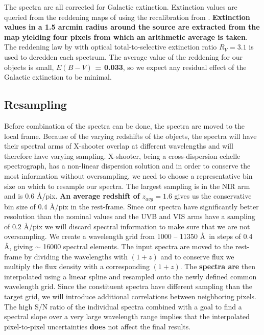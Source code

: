 \documentclass{aa}    %
\newcommand{\sectlabel}[1]{\label{sect:#1}}
\begin{document}
The spectra are all corrected for Galactic extinction. Extinction
values are queried from the reddening maps of \citet{Schlegel1998}
using the recalibration from \citet{Schlafly2011}. \textbf{Extinction values
in a 1.5 arcmin radius around the source are extracted from the map yielding four pixels from which an arithmetic average is taken}. The reddening law by
\citet{Fitzpatrick1999} with optical total-to-selective extinction
ratio $R_V = 3.1$ is used to deredden each spectrum. The average value
of the reddening for our objects is small, \textbf{$E(B-V)$ = 0.033}, so we
expect any residual effect of the Galactic extinction to be minimal.





\subsection{Resampling} \sectlabel{rebin}

Before combination of the spectra can be done, the spectra are moved
to the local frame. Because of the varying redshifts of the objects,
the spectra will have their spectral arms of X-shooter overlap at
different wavelengths and will therefore have varying
sampling. X-shooter, being a cross-dispersion echelle spectrograph,
has a non-linear dispersion solution and in order to conserve the most
information without oversampling, we need to choose a representative
bin size on which to resample our spectra. The largest sampling is in
the NIR arm and is $0.6$ \AA/pix. \textbf{An average redshift of} $z_{avg}
= 1.6$ gives us the conservative bin size of $0.4$ \AA/pix in the
rest-frame.  
Since our spectra have significantly better resolution than the
nominal values and the UVB and VIS arms have a sampling of $0.2$
\AA/pix we will discard spectral information to make sure that we are
not oversampling. We create a wavelength grid from 1000 -- 11350 \AA~in
steps of 0.4 \AA, giving $\sim$ 16000 spectral elements. The input spectra are moved to the rest-frame
by dividing the wavelengths with $(1 + z)$ and to conserve flux we
multiply the flux density with a corresponding $(1 + z)$. The \textbf{spectra
are} then interpolated using a linear spline and
resampled onto the newly defined common wavelength grid. Since the
constituent spectra have different sampling than the target grid, we
will introduce additional correlations between neighboring
pixels. The high S/N ratio of the individual spectra combined with a goal to
find a spectral slope over a very large wavelength range implies that the
interpolated pixel-to-pixel uncertainties \textbf{does} not affect the final results.
\end{document}
